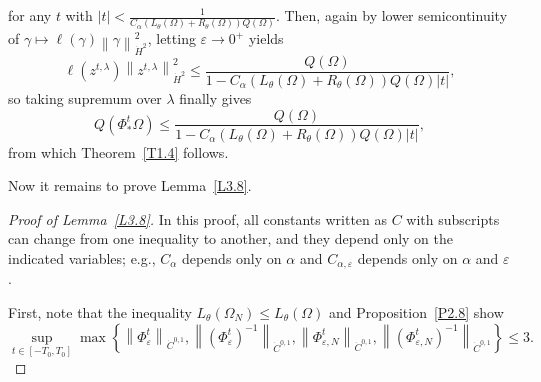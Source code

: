 \documentclass[reqno,centertags,12pt]{amsart}
\theoremstyle{definition}
\numberwithin{equation}{section}
\newcommand{\abs}[1]{\left\lvert#1\right\rvert}
\newcommand{\norm}[1]{\left\|#1\right\|}
\newcommand{\set}[1]{\left\{ #1 \right\}}
\newcommand{\eps}{\varepsilon}
\newcommand{\tht}{\theta}
\begin{document}
for any $t$ with $\abs{t} < \frac{1}{C_{\alpha}(L_{\tht}(\Omega) + R_{\tht}(\Omega))Q(\Omega)}$.
Then, again by lower semicontinuity of
$\gamma\mapsto\ell(\gamma)\norm{\gamma}_{\dot{H}^{2}}^{2}$,
letting $\eps\to 0^{+}$ yields
\[
    \ell(z^{t,\lambda})
    \norm{z^{t,\lambda}}_{\dot{H}^{2}}^{2} \leq \frac{Q(\Omega)}
    {1 - C_{\alpha}(L_{\tht}(\Omega) + R_{\tht}(\Omega))Q(\Omega)\abs{t}},
\]
so taking supremum over $\lambda$ finally gives
\[
    Q(\Phi_{*}^{t}\Omega) \leq \frac{Q(\Omega)}
    {1 - C_{\alpha}(L_{\tht}(\Omega) + R_{\tht}(\Omega))Q(\Omega)\abs{t}},
\]
from which Theorem~\ref{T1.4} follows.

Now it remains to prove Lemma~\ref{L3.8}.

\begin{proof}[Proof of Lemma~\ref{L3.8}]
    In this proof, all constants written as $C$ with subscripts can change
    from one inequality to another, and they depend only on the indicated variables;
    e.g., $C_{\alpha}$ depends only on $\alpha$ and $C_{\alpha,\eps}$ depends only on
    $\alpha$ and $\eps$.

    First, note that the inequality $L_{\tht}(\Omega_{N})\leq L_{\tht}(\Omega)$
    and Proposition~\ref{P2.8} show
    \begin{equation}\label{3.15}
        \sup_{t\in[-T_{0},T_{0}]}\max\set{
            \norm{\Phi_{\eps}^{t}}_{\dot{C}^{0,1}},
            \norm{(\Phi_{\eps}^{t})^{-1}}_{\dot{C}^{0,1}},
            \norm{\Phi_{\eps,N}^{t}}_{\dot{C}^{0,1}},
            \norm{(\Phi_{\eps,N}^{t})^{-1}}_{\dot{C}^{0,1}}
        } \leq 3.
    \end{equation}


\end{proof}
\end{document}
